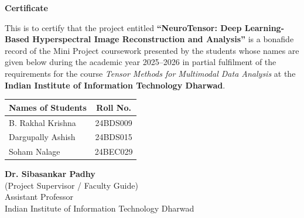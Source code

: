 \newpage
\thispagestyle{empty}
\begin{center}
{\Large \textbf{Certificate}}
\end{center}
\vspace{0.6cm}

\noindent This is to certify that the project entitled \textbf{``NeuroTensor: Deep Learning-Based Hyperspectral Image Reconstruction and Analysis''} is a bonafide record of the Mini Project coursework presented by the students whose names are given below during the academic year 2025--2026 in partial fulfilment of the requirements for the course \textit{Tensor Methods for Multimodal Data Analysis} at the \textbf{Indian Institute of Information Technology Dharwad}.

\vspace{0.8cm}

\begin{center}
\begin{tabularx}{0.85\textwidth}{X c}
\toprule
\textbf{Names of Students} & \textbf{Roll No.} \\
\midrule
B. Rakhal Krishna & 24BDS009 \\
Dargupally Ashish & 24BDS015 \\
Soham Nalage & 24BEC029 \\
\bottomrule
\end{tabularx}
\end{center}

\vspace{1.8cm}

\begin{flushright}
\textbf{Dr. Sibasankar Padhy}\\
(Project Supervisor / Faculty Guide)\\
Assistant Professor\\
Indian Institute of Information Technology Dharwad
\end{flushright}

\newpage
\setcounter{page}{1}

